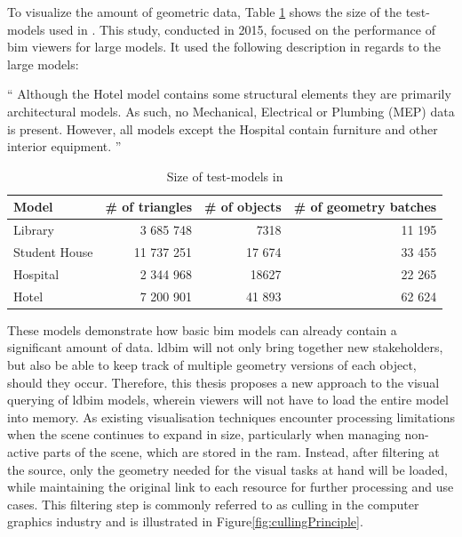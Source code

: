 To visualize the amount of geometric data, Table \ref{tab:sizeModels} shows the size of the test-models used in \cite{Johansson2015}. This study, conducted in 2015, focused on the performance of \ac{bim} viewers for large models. It used the following description in regards to the large models:

\enquote{
	Although the Hotel model contains some structural elements they are primarily architectural models. As such, no Mechanical, Electrical or Plumbing (MEP) data is present. However, all models except the Hospital contain furniture and other interior equipment.
} \parencite{Johansson2015}

\begin{table}[h]
	\centering
	\begin{tabular}{@{}lrrr@{}}
		\toprule
		Model         & \multicolumn{1}{l}{\# of  triangles} & \multicolumn{1}{l}{\# of objects} & \multicolumn{1}{l}{\# of geometry batches} \\ \midrule
		Library       & 3 685 748                            & 7318                              & 11 195                                     \\
		Student House & 11 737 251                           & 17 674                            & 33 455                                     \\
		Hospital      & 2 344 968                            & 18627                             & 22 265                                     \\
		Hotel         & 7 200 901                            & 41 893                            & 62 624                                     \\ \bottomrule
	\end{tabular}
	\caption{Size of test-models in \cite{Johansson2015}}
	\label{tab:sizeModels}
\end{table}

These models demonstrate how basic \ac{bim} models can already contain a significant amount of data. \ac{ldbim} will not only bring together new stakeholders, but also be able to keep track of multiple geometry versions of each object, should they occur. Therefore, this thesis proposes a new approach to the visual querying of \ac{ldbim} models, wherein viewers will not have to load the entire model into memory. As existing visualisation techniques encounter processing limitations when the scene continues to expand in size, particularly when managing non-active parts of the scene, which are stored in the \ac{ram}. Instead, after filtering at the source, only the geometry needed for the visual tasks at hand will be loaded, while maintaining the original link to each resource for further processing and use cases. This filtering step is commonly referred to as culling in the computer graphics industry and is illustrated in Figure\ref{fig:cullingPrinciple}.

